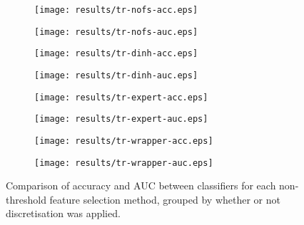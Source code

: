 \begin{figure*}[htbp]
\begin{subfigure}{.50\textwidth}
\texttt{[image: results/tr-nofs-acc.eps]}
\caption{}
\label{fig:tr-nothreshold-nofs-acc}
\end{subfigure}%
\begin{subfigure}{.57\textwidth}
\texttt{[image: results/tr-nofs-auc.eps]}
\caption{}
\label{fig:tr-nothreshold-nofs-auc}
\end{subfigure}

\begin{subfigure}{.50\textwidth}
\texttt{[image: results/tr-dinh-acc.eps]}
\caption{}
\label{fig:tr-nothreshold-dinh-acc}
\end{subfigure}%
\begin{subfigure}{.57\textwidth}
\texttt{[image: results/tr-dinh-auc.eps]}
\caption{}
\label{fig:tr-nothreshold-dinh-auc}
\end{subfigure}

\begin{subfigure}{.50\textwidth}
\texttt{[image: results/tr-expert-acc.eps]}
\caption{}
\label{fig:tr-nothreshold-expert-acc}
\end{subfigure}%
\begin{subfigure}{.57\textwidth}
\texttt{[image: results/tr-expert-auc.eps]}
\caption{}
\label{fig:tr-nothreshold-expert-auc}
\end{subfigure}

\begin{subfigure}{.50\textwidth}
\texttt{[image: results/tr-wrapper-acc.eps]}
\caption{}
\label{fig:tr-nothreshold-wrapper-acc}
\end{subfigure}%
\begin{subfigure}{.57\textwidth}
\texttt{[image: results/tr-wrapper-auc.eps]}
\caption{}
\label{fig:tr-nothreshold-wrapper-auc}
\end{subfigure}
\caption[]{Comparison of accuracy and AUC between classifiers for each non-threshold feature selection method, grouped by whether or not discretisation was applied.}
\label{fig:tr-nothreshold}
\end{figure*}
